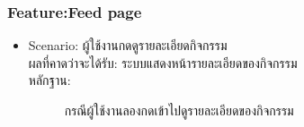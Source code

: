 \documentclass[14pt,oneside,openright,a4paper]{cpe-thai-project}
\begin{document}
\subsubsection{Feature:Feed page}
\begin{itemize}
  \item Scenario: ผู้ใช้งานกดดูรายละเอียดกิจกรรม
  \\ผลที่คาดว่าจะได้รับ: ระบบแสดงหน้ารายละเอียดของกิจกรรม
  \\หลักฐาน:\\
  \begin{figure}[!h]\centering
    \setlength{\fboxrule}{0.5mm} %
    \setlength{\fboxsep}{0.5cm}
    \caption{กรณีผู้ใช้งานลองกดเข้าไปดูรายละเอียดของกิจกรรม}\label{fig:FeedPageEventTest}
  \end{figure}
\end{itemize}

\newpage
\end{document}

